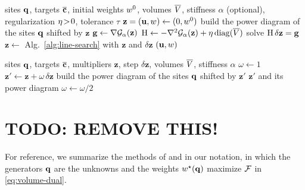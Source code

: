 \documentclass[main.tex]{subfiles}
\begin{document}
\begin{algorithm}[H]
  \caption{Newton solve of $\jointdual_\alpha$ or of $\jointdual$.}
  \label{alg:newton}
  \begin{algorithmic}[1]
    \Require sites $\mathbf{q}$, targets $\overline{\mathbf{c}}$, initial weights $w^0$, volumes $\overline{V}$, stiffness $\alpha$ (optional), regularization $\eta \!>\! 0$, tolerance $\tau$
    \State $\mathbf{z} = (\mathbf{u}, w) \gets (0, w^0)$
    \State build the power diagram of the sites $\mathbf{q}$ shifted by $\mathbf{z}$ \Comment{\eqref{eq:shifted-site}}
    \Repeat
      \State $\mathbf{g} \gets \nabla\mathcal{G}_\alpha(\mathbf{z})$ \Comment{\eqref{eq:joint-gradient}, \eqref{eq:regularized-gradient-shift}}
      \State $\mathrm{H} \gets -\nabla^2\mathcal{G}_\alpha(\mathbf{z}) + \eta\,\mathrm{diag}(\overline{V})$ \Comment{\eqref{eq:appendix-bordered-matrix}}
      \State solve $\mathrm{H}\,\delta\mathbf{z} = \mathbf{g}$
      \State $\mathbf{z} \gets$ Alg.~\ref{alg:line-search} with $\mathbf{z}$ and $\delta\mathbf{z}$
    \State \Return $(\mathbf{u}, w)$
  \end{algorithmic}
\end{algorithm}

\begin{algorithm}[H]
  \caption{Backtracking line search on $\jointdual_\alpha$ or on $\jointdual$.}
  \label{alg:line-search}
  \begin{algorithmic}[1]
    \Require sites $\mathbf{q}$, targets $\overline{\mathbf{c}}$, multipliers $\mathbf{z}$, step $\delta\mathbf{z}$, volumes $\overline{V}$, stiffness $\alpha$
    \State $\omega \gets 1$
    \Loop
      \State $\mathbf{z}' \gets \mathbf{z} + \omega\,\delta\mathbf{z}$
      \State build the power diagram of the sites $\mathbf{q}$ shifted by $\mathbf{z}'$ \Comment{\eqref{eq:shifted-site}}
        \State \Return $\mathbf{z}'$ and its power diagram
      \EndIf
      \State $\omega \gets \omega / 2$
    \EndLoop
  \end{algorithmic}
\end{algorithm}

\section{TODO: REMOVE THIS!}
\label{sec:appendix-prior}

For reference, we summarize the methods of \citet{Bourne2025Inverting} and \citet{Bourne2026ConvexOrder} in our notation, in which the generators $\mathbf{q}$ are the unknowns and the weights $w^\star(\mathbf{q})$ maximize $\mathcal{F}$ in \eqref{eq:volume-dual}.
\end{document}
